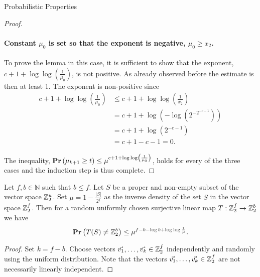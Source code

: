 \begin{section}{Probabilistic Properties}
\begin{proof}
\paragraph{Constant $\mu_0$ is set so that the exponent is negative, $\mu_0 \geq x_2$.}
To prove the lemma in this case, it is sufficient to show that the exponent, $c + 1 + \log \log \left( \frac{1}{\mu_0} \right)$, is not positive. As already observed before the estimate is then at least 1. The exponent is non-positive since
\[
\begin{split}
	c + 1 + \log \log \left( \frac{1}{\mu_0} \right) 
		& \leq c + 1 + \log \log \left( \frac{1}{x_2} \right) \\ 
		& = c + 1 + \log \left(- \log \left(2 ^ {-2 ^ {-c - 1}}\right)\right) \\ 
		& = c + 1 + \log \left(2 ^ {-c - 1}\right) \\ 
		& = c + 1 - c - 1 = 0 \text{.}
\end{split}
\]

The inequality, $\mathbf{Pr}\left(\mu_{k + 1} \geq t\right) \leq \mu ^ {c + 1 + \log \log \left( \frac{1}{\mu_0} \right)}$, holds for every of the three cases and the induction step is thus complete.
\end{proof}

\begin{theorem}
\label{theorem-linear-function-set-onto}
Let $f, b \in \mathbb{N}$ such that $b \leq f$. Let $S$ be a proper and non-empty subset of the vector space $\mathbb{Z}_{2}^{u}$. Set $\mu = 1 - \frac{|S|}{2 ^ f}$ as the inverse density of the set $S$ in the vector space $\mathbb{Z}_{2}^{f}$. Then for a random uniformly chosen surjective linear map $T: \mathbb{Z}_{2}^{f} \rightarrow \mathbb{Z}_{2}^{b}$ we have
\[
	\mathbf{Pr}\left(T(S) \neq \mathbb{Z}_{2}^{b}\right) \leq \mu^{f - b - \log b + \log \log \frac{1}{\mu}} \text{.}
\]
\end{theorem}
\begin{proof}
Set $k = f - b$. Choose vectors $\vec{v_1}, \dots, \vec{v_k} \in \mathbb{Z}_{2}^{f}$ independently and randomly using the uniform distribution. Note that the vectors $\vec{v_1}, \dots, \vec{v_k} \in \mathbb{Z}_{2}^{f}$ are not necessarily linearly independent.


\end{proof}
\end{section}
